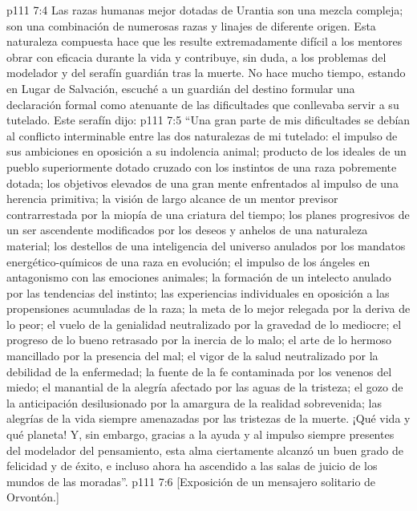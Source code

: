 \vs p111 7:4 Las razas humanas mejor dotadas de Urantia son una mezcla compleja; son una combinación de numerosas razas y linajes de diferente origen. Esta naturaleza compuesta hace que les resulte extremadamente difícil a los mentores obrar con eficacia durante la vida y contribuye, sin duda, a los problemas del modelador y del serafín guardián tras la muerte. No hace mucho tiempo, estando en Lugar de Salvación, escuché a un guardián del destino formular una declaración formal como atenuante de las dificultades que conllevaba servir a su tutelado. Este serafín dijo:
\vs p111 7:5 \pc “Una gran parte de mis dificultades se debían al conflicto interminable entre las dos naturalezas de mi tutelado: el impulso de sus ambiciones en oposición a su indolencia animal; producto de los ideales de un pueblo superiormente dotado cruzado con los instintos de una raza pobremente dotada; los objetivos elevados de una gran mente enfrentados al impulso de una herencia primitiva; la visión de largo alcance de un mentor previsor contrarrestada por la miopía de una criatura del tiempo; los planes progresivos de un ser ascendente modificados por los deseos y anhelos de una naturaleza material; los destellos de una inteligencia del universo anulados por los mandatos energético\hyp{}químicos de una raza en evolución; el impulso de los ángeles en antagonismo con las emociones animales; la formación de un intelecto anulado por las tendencias del instinto; las experiencias individuales en oposición a las propensiones acumuladas de la raza; la meta de lo mejor relegada por la deriva de lo peor; el vuelo de la genialidad neutralizado por la gravedad de lo mediocre; el progreso de lo bueno retrasado por la inercia de lo malo; el arte de lo hermoso mancillado por la presencia del mal; el vigor de la salud neutralizado por la debilidad de la enfermedad; la fuente de la fe contaminada por los venenos del miedo; el manantial de la alegría afectado por las aguas de la tristeza; el gozo de la anticipación desilusionado por la amargura de la realidad sobrevenida; las alegrías de la vida siempre amenazadas por las tristezas de la muerte. ¡Qué vida y qué planeta! Y, sin embargo, gracias a la ayuda y al impulso siempre presentes del modelador del pensamiento, esta alma ciertamente alcanzó un buen grado de felicidad y de éxito, e incluso ahora ha ascendido a las salas de juicio de los mundos de las moradas”.
\vsetoff
\vs p111 7:6 [Exposición de un mensajero solitario de Orvontón.]
